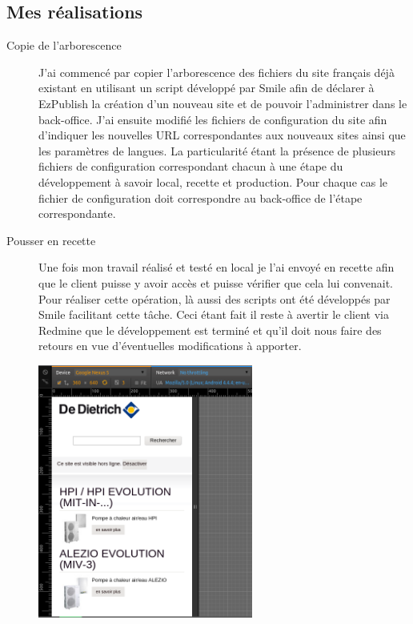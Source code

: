 \documentclass[a4paper,11pt,twoside]{report}
\begin{document}
    \subsection*{Mes réalisations}
      \begin{description}

	\item[Copie de l'arborescence] J'ai commencé par copier l'arborescence des fichiers du site français déjà existant en utilisant un script développé par Smile afin de déclarer à EzPublish la création d'un nouveau site et de pouvoir l'administrer dans le back-office. J'ai ensuite modifié les fichiers de configuration du site afin d'indiquer les nouvelles URL correspondantes aux nouveaux sites ainsi que les paramètres de langues. La particularité étant la présence de plusieurs fichiers de configuration correspondant chacun à une étape du développement à savoir local, recette et production. Pour chaque cas le fichier de configuration doit correspondre au back-office de l'étape correspondante.  
	\item[Pousser en recette] Une fois mon travail réalisé et testé en local je l'ai envoyé en recette afin que le client puisse y avoir accès et puisse vérifier que cela lui convenait. Pour réaliser cette opération, là aussi des scripts ont été développés par Smile facilitant cette tâche. Ceci étant fait il reste à avertir le client via Redmine que le développement est terminé et qu'il doit nous faire des retours en vue d'éventuelles modifications à apporter.
	\begin{center}
	  \includegraphics[width=200pt]{images/DDTH_home_be_fr.png} 

\end{center}
\end{description}
\end{document}
